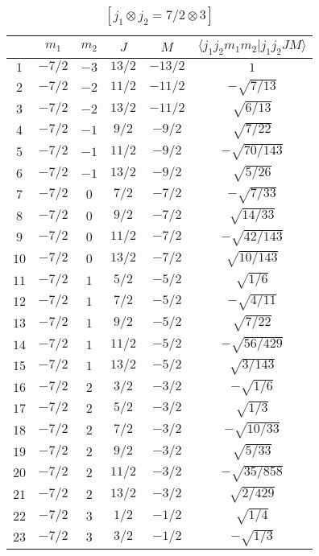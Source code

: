 \begin{table}
\tiny
\caption{$[j_1 \otimes j_2 = 7/2 \otimes 3]$}
\begin{center}
\begin{tabular}{|c|c|c|c|c|c|}
\hline 
   & $m_1$ & $m_2$ & $J$ & $M$ & $\langle j_1 j_2 m_1 m_2 | j_1 j_2 J M \rangle$ \\ 
\hline 
$1$ & $-7/2$ & $-3$ & $13/2$ & $-13/2$ & $1$ \\ 
$2$ & $-7/2$ & $-2$ & $11/2$ & $-11/2$ & $-\sqrt{7/13}$ \\ 
$3$ & $-7/2$ & $-2$ & $13/2$ & $-11/2$ & $\sqrt{6/13}$ \\ 
$4$ & $-7/2$ & $-1$ & $9/2$ & $-9/2$ & $\sqrt{7/22}$ \\ 
$5$ & $-7/2$ & $-1$ & $11/2$ & $-9/2$ & $-\sqrt{70/143}$ \\ 
$6$ & $-7/2$ & $-1$ & $13/2$ & $-9/2$ & $\sqrt{5/26}$ \\ 
$7$ & $-7/2$ & $0$ & $7/2$ & $-7/2$ & $-\sqrt{7/33}$ \\ 
$8$ & $-7/2$ & $0$ & $9/2$ & $-7/2$ & $\sqrt{14/33}$ \\ 
$9$ & $-7/2$ & $0$ & $11/2$ & $-7/2$ & $-\sqrt{42/143}$ \\ 
$10$ & $-7/2$ & $0$ & $13/2$ & $-7/2$ & $\sqrt{10/143}$ \\ 
$11$ & $-7/2$ & $1$ & $5/2$ & $-5/2$ & $\sqrt{1/6}$ \\ 
$12$ & $-7/2$ & $1$ & $7/2$ & $-5/2$ & $-\sqrt{4/11}$ \\ 
$13$ & $-7/2$ & $1$ & $9/2$ & $-5/2$ & $\sqrt{7/22}$ \\ 
$14$ & $-7/2$ & $1$ & $11/2$ & $-5/2$ & $-\sqrt{56/429}$ \\ 
$15$ & $-7/2$ & $1$ & $13/2$ & $-5/2$ & $\sqrt{3/143}$ \\ 
$16$ & $-7/2$ & $2$ & $3/2$ & $-3/2$ & $-\sqrt{1/6}$ \\ 
$17$ & $-7/2$ & $2$ & $5/2$ & $-3/2$ & $\sqrt{1/3}$ \\ 
$18$ & $-7/2$ & $2$ & $7/2$ & $-3/2$ & $-\sqrt{10/33}$ \\ 
$19$ & $-7/2$ & $2$ & $9/2$ & $-3/2$ & $\sqrt{5/33}$ \\ 
$20$ & $-7/2$ & $2$ & $11/2$ & $-3/2$ & $-\sqrt{35/858}$ \\ 
$21$ & $-7/2$ & $2$ & $13/2$ & $-3/2$ & $\sqrt{2/429}$ \\ 
$22$ & $-7/2$ & $3$ & $1/2$ & $-1/2$ & $\sqrt{1/4}$ \\ 
$23$ & $-7/2$ & $3$ & $3/2$ & $-1/2$ & $-\sqrt{1/3}$ \\ 

\end{tabular}
\end{center}
\end{table}
